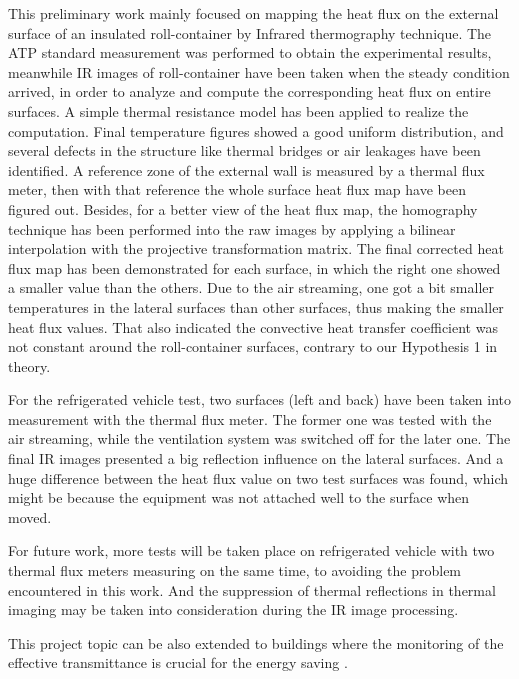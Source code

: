 This preliminary work mainly focused on mapping the heat flux on the external surface of an insulated roll-container by Infrared thermography technique. The ATP standard measurement was performed to obtain the experimental results, meanwhile IR images of roll-container have been taken when the steady condition arrived, in order to analyze and compute the corresponding heat flux on entire surfaces. A simple thermal resistance model has been applied to realize the computation. Final temperature figures showed a good uniform distribution, and several defects in the structure like thermal bridges or air leakages have been identified. A reference zone of the external wall is measured by a thermal flux meter, then with that reference the whole surface heat flux map have been figured out. Besides, for a better view of the heat flux map, the homography technique has been performed into the raw images by applying a bilinear interpolation with the projective transformation matrix. The final corrected heat flux map has been demonstrated for each surface, in which the right one showed a smaller value than the others. Due to the air streaming, one got a bit smaller temperatures in the lateral surfaces than other surfaces, thus making the smaller heat flux values. That also indicated the convective heat transfer coefficient was not constant around the roll-container surfaces, contrary to our Hypothesis 1 in theory.

For the refrigerated vehicle test, two surfaces (left and back) have been taken into measurement with the thermal flux meter. The former one was tested with the air streaming, while the ventilation system was switched off for the later one. The final IR images presented a big reflection influence on the lateral surfaces. And a huge difference between the heat flux value on two test surfaces was found, which might be because the equipment was not attached well to the surface when moved. 

For future work, more tests will be taken place on refrigerated vehicle with two thermal flux meters measuring on the same time, to avoiding the problem encountered in this work. And the suppression of thermal reflections in thermal imaging \citep{vollmer2004identification} may be taken into consideration during the IR image processing. 

This project topic can be also extended to buildings where the monitoring of the effective transmittance is crucial for the energy saving \citep{grinzato2010r}.